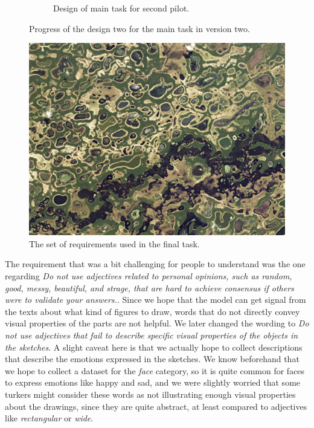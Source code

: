 \begin{figure}[!htb]
\begin{subfigure}{0.5\textwidth}
  \caption{Design of main task for second pilot.}
  \label{v2.requirement.examples.6}
\end{subfigure}
\caption{Progress of the design two for the main task in version two.}
\label{v2.requirement.examples}
\end{figure}

\begin{figure}[h]
\includegraphics[width=.8\linewidth]{pantanal.jpeg}  
\caption{The set of requirements used in the final task.}
\label{v2.requirement.1}
\end{figure}

The requirement that was a bit challenging for people to understand was the one regarding
\textit{Do not use adjectives related to personal opinions, such as random, good, messy, beautiful, and strage, that are hard to achieve consensus if others were to validate your answers.}. Since we hope that the model can get signal from the texts about what kind of figures to draw, words that do not directly convey visual properties of the parts are not helpful. We later changed the wording to \textit{Do not use adjectives that fail to describe specific visual properties of the objects in the sketches}. A slight caveat here is that we actually hope to collect descriptions that describe the emotions expressed in the sketches. We know beforehand that we hope to collect a dataset for the \textit{face} category, so it is quite common for faces to express emotions like happy and sad, and we were slightly worried that some turkers might consider these words as not illustrating enough visual properties about the drawings, since they are quite abstract, at least compared to adjectives like \textit{rectangular} or \textit{wide}. 



